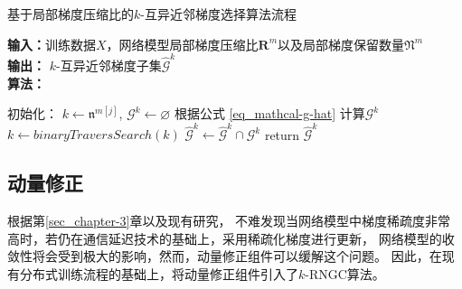 \documentclass{xdupgthesis}
\begin{document}
\renewcommand{\arraystretch}{1.3}
\begin{algorithm}[ht]
    \caption{基于局部梯度压缩比的$k$-互异近邻梯度选择算法流程}
    \label{alg_k-RNGC-knn}
    \raggedright
    \hspace*{0.02in} \textbf{输入：}训练数据$X$，网络模型局部梯度压缩比$\mathbf{R}^{m}$以及局部梯度保留数量$\mathfrak{N}^{m}$ \\
    \hspace*{0.02in} \textbf{输出：} $k$-互异近邻梯度子集$\hat{\mathcal{G}}^{k}$ \\
    \hspace*{0.02in} \textbf{算法：} \\
    \begin{algorithmic}[1]
            \State 初始化： $k \leftarrow \mathfrak{n}^{m[j]}$, $\mathcal{G}^{k} \leftarrow \varnothing$ 
                \State 根据公式 \eqref{eq_mathcal-g-hat} 计算$\mathcal{G}^{k}$
                \State $k \leftarrow  binaryTraversSearch(k)$
                \State $\hat{\mathcal{G}}^{k} \leftarrow \hat{\mathcal{G}}^{k} \cap \mathcal{G}^{k}$
            \EndWhile
        \EndFor
        \State return $\hat{\mathcal{G}}^{k}$
    \end{algorithmic}
\end{algorithm}

\subsection{动量修正}
根据第\ref{sec_chapter-3}章以及现有研究\cite{chen2018adacomp}，
不难发现当网络模型中梯度稀疏度非常高时，若仍在通信延迟技术的基础上，采用稀疏化梯度进行更新，
网络模型的收敛性将会受到极大的影响，然而，动量修正组件可以缓解这个问题。
因此，在现有分布式训练流程的基础上，将动量修正组件引入了$k$-RNGC算法。
\end{document}

